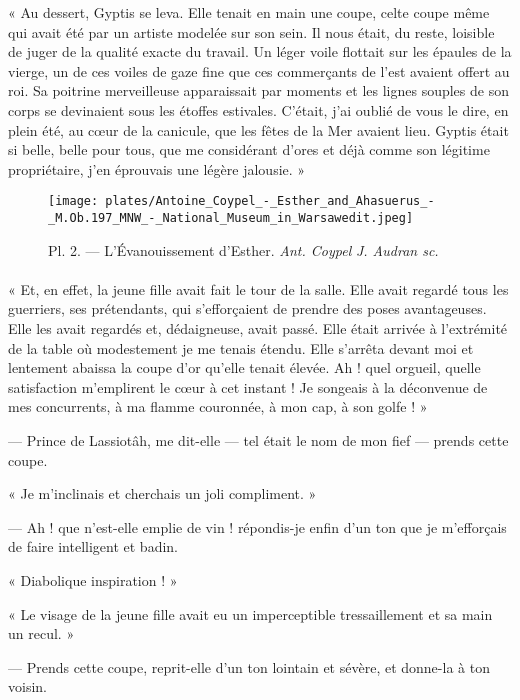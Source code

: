 \documentclass[a4paper, 11pt, oneside, polutonikogreek, french]{article}
\begin{document}
« Au dessert, Gyptis se leva. Elle tenait en main une coupe, celte coupe même qui avait été par un artiste modelée sur son sein. Il nous était, du reste, loisible de juger de la qualité exacte du travail. Un léger voile flottait sur les épaules de la vierge, un de ces voiles de gaze fine que ces commerçants de l'est avaient offert au roi. Sa poitrine merveilleuse apparaissait par moments et les lignes souples de son corps se devinaient sous les étoffes estivales. C'était, j'ai oublié de vous le dire, en plein été, au cœur de la canicule, que les fêtes de la Mer avaient lieu. Gyptis était si belle, belle pour tous, que me considérant d'ores et déjà comme son légitime propriétaire, j'en éprouvais une légère jalousie. »
\clearpage
\begin{landscape}
\begin{figure}[H]
\centering
\texttt{[image: plates/Antoine\_Coypel\_-\_Esther\_and\_Ahasuerus\_-\_M.Ob.197\_MNW\_-\_National\_Museum\_in\_Warsawedit.jpeg]}
\caption{Pl. 2. --- L'Évanouissement d'Esther. \emph{Ant. Coypel} \emph{J. Audran sc.}}
\end{figure}
\end{landscape}
\clearpage
\paragraph{}
« Et, en effet, la jeune fille avait fait le tour de la salle. Elle avait regardé tous les guerriers, ses prétendants, qui s'efforçaient de prendre des poses avantageuses. Elle les avait regardés et, dédaigneuse, avait passé. Elle était arrivée à l'extrémité de la table où modestement je me tenais étendu. Elle s'arrêta devant moi et lentement abaissa la coupe d'or qu'elle tenait élevée. Ah ! quel orgueil, quelle satisfaction m'emplirent le cœur à cet instant ! Je songeais à la déconvenue de mes concurrents, à ma flamme couronnée, à mon cap, à son golfe ! »

--- Prince de Lassiotâh, me dit-elle --- tel était le nom de mon fief --- prends cette coupe.

« Je m'inclinais et cherchais un joli compliment. »

--- Ah ! que n'est-elle emplie de vin ! répondis-je enfin d'un ton que je m'efforçais de faire intelligent et badin.

« Diabolique inspiration ! »

« Le visage de la jeune fille avait eu un imperceptible tressaillement et sa main un recul. »

--- Prends cette coupe, reprit-elle d'un ton lointain et sévère, et donne-la à ton voisin.
\end{document}
